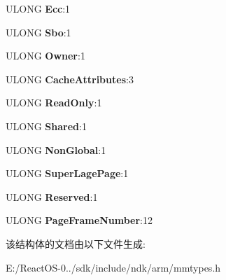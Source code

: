 \begin{DoxyCompactItemize}
\mbox{\label{struct___h_a_r_d_w_a_r_e___l_a_r_g_e___p_t_e___a_r_m_v6_a78dac85ec8f3b982b7bb246c50a6371d}} 
U\+L\+O\+NG {\bfseries Ecc}\+:1
\item 
\mbox{\label{struct___h_a_r_d_w_a_r_e___l_a_r_g_e___p_t_e___a_r_m_v6_a83b94fb0c96f6b5ba84c33c9bfc0dff5}} 
U\+L\+O\+NG {\bfseries Sbo}\+:1
\item 
\mbox{\label{struct___h_a_r_d_w_a_r_e___l_a_r_g_e___p_t_e___a_r_m_v6_a1c2d0f7a180581ad0a8d9d7eb48a7256}} 
U\+L\+O\+NG {\bfseries Owner}\+:1
\item 
\mbox{\label{struct___h_a_r_d_w_a_r_e___l_a_r_g_e___p_t_e___a_r_m_v6_a704be5afc72253b186089f12c0b0d5ee}} 
U\+L\+O\+NG {\bfseries Cache\+Attributes}\+:3
\item 
\mbox{\label{struct___h_a_r_d_w_a_r_e___l_a_r_g_e___p_t_e___a_r_m_v6_abb9a8fc662641c365b69a2505b5d2041}} 
U\+L\+O\+NG {\bfseries Read\+Only}\+:1
\item 
\mbox{\label{struct___h_a_r_d_w_a_r_e___l_a_r_g_e___p_t_e___a_r_m_v6_a33c0275c3e7ef115f7aaaa083a82dab2}} 
U\+L\+O\+NG {\bfseries Shared}\+:1
\item 
\mbox{\label{struct___h_a_r_d_w_a_r_e___l_a_r_g_e___p_t_e___a_r_m_v6_a72015925e8ff43f62e2dca8d5a1ce8f0}} 
U\+L\+O\+NG {\bfseries Non\+Global}\+:1
\item 
\mbox{\label{struct___h_a_r_d_w_a_r_e___l_a_r_g_e___p_t_e___a_r_m_v6_ac1860e03edbad69c1ef7d9c06b326881}} 
U\+L\+O\+NG {\bfseries Super\+Lage\+Page}\+:1
\item 
\mbox{\label{struct___h_a_r_d_w_a_r_e___l_a_r_g_e___p_t_e___a_r_m_v6_a1f40920afff8c79e25fbfb11d54aafd4}} 
U\+L\+O\+NG {\bfseries Reserved}\+:1
\item 
\mbox{\label{struct___h_a_r_d_w_a_r_e___l_a_r_g_e___p_t_e___a_r_m_v6_ace5117f944327ebf1b3a4cd8f39694a6}} 
U\+L\+O\+NG {\bfseries Page\+Frame\+Number}\+:12
\end{DoxyCompactItemize}


该结构体的文档由以下文件生成\+:\begin{DoxyCompactItemize}
\item 
E\+:/\+React\+O\+S-\/0../sdk/include/ndk/arm/mmtypes.\+h\end{DoxyCompactItemize}
